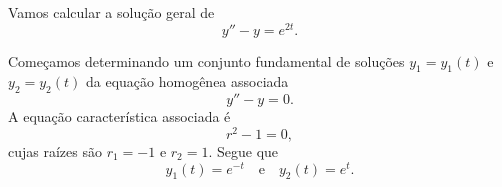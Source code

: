 \begin{ex}\label{ex:ed2o_nh_vp}
  Vamos calcular a solução geral de
  \begin{equation}\label{eq:ex_ed2o_nh_vp}
    y'' - y = e^{2t}.
  \end{equation}

  Começamos determinando um conjunto fundamental de soluções $y_1 = y_1(t)$ e $y_2 = y_2(t)$ da equação homogênea associada
  \begin{equation}
    y'' - y = 0.
  \end{equation}
  A equação característica associada é
  \begin{equation}
    r^2 - 1 = 0,
  \end{equation}
  cujas raízes são $r_1=-1$ e $r_2=1$. Segue que
  \begin{equation}
    y_1(t) = e^{-t}\quad\text{e}\quad y_2(t) = e^t.
  \end{equation}


\end{ex}
